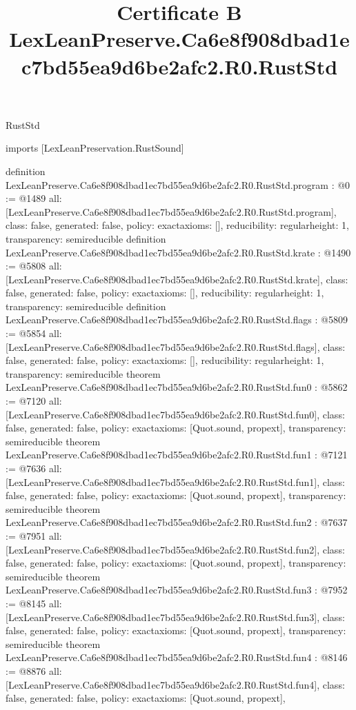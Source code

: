\begin{lexlean}{RustStd}
\title{Certificate B LexLeanPreserve.Ca6e8f908dbad1ec7bd55ea9d6be2afc2.R0.RustStd}
\begin{coremodule}
imports [LexLeanPreservation.RustSound]

definition LexLeanPreserve.Ca6e8f908dbad1ec7bd55ea9d6be2afc2.R0.RustStd.program : @0 := @1489 {
  all: [LexLeanPreserve.Ca6e8f908dbad1ec7bd55ea9d6be2afc2.R0.RustStd.program],
  class: false,
  generated: false,
  policy: exact{axioms: []},
  reducibility: regular{height: 1},
  transparency: semireducible
}
definition LexLeanPreserve.Ca6e8f908dbad1ec7bd55ea9d6be2afc2.R0.RustStd.krate : @1490 := @5808 {
  all: [LexLeanPreserve.Ca6e8f908dbad1ec7bd55ea9d6be2afc2.R0.RustStd.krate],
  class: false,
  generated: false,
  policy: exact{axioms: []},
  reducibility: regular{height: 1},
  transparency: semireducible
}
definition LexLeanPreserve.Ca6e8f908dbad1ec7bd55ea9d6be2afc2.R0.RustStd.flags : @5809 := @5854 {
  all: [LexLeanPreserve.Ca6e8f908dbad1ec7bd55ea9d6be2afc2.R0.RustStd.flags],
  class: false,
  generated: false,
  policy: exact{axioms: []},
  reducibility: regular{height: 1},
  transparency: semireducible
}
theorem LexLeanPreserve.Ca6e8f908dbad1ec7bd55ea9d6be2afc2.R0.RustStd.fun0 : @5862 := @7120 {
  all: [LexLeanPreserve.Ca6e8f908dbad1ec7bd55ea9d6be2afc2.R0.RustStd.fun0],
  class: false,
  generated: false,
  policy: exact{axioms: [Quot.sound, propext]},
  transparency: semireducible
}
theorem LexLeanPreserve.Ca6e8f908dbad1ec7bd55ea9d6be2afc2.R0.RustStd.fun1 : @7121 := @7636 {
  all: [LexLeanPreserve.Ca6e8f908dbad1ec7bd55ea9d6be2afc2.R0.RustStd.fun1],
  class: false,
  generated: false,
  policy: exact{axioms: [Quot.sound, propext]},
  transparency: semireducible
}
theorem LexLeanPreserve.Ca6e8f908dbad1ec7bd55ea9d6be2afc2.R0.RustStd.fun2 : @7637 := @7951 {
  all: [LexLeanPreserve.Ca6e8f908dbad1ec7bd55ea9d6be2afc2.R0.RustStd.fun2],
  class: false,
  generated: false,
  policy: exact{axioms: [Quot.sound, propext]},
  transparency: semireducible
}
theorem LexLeanPreserve.Ca6e8f908dbad1ec7bd55ea9d6be2afc2.R0.RustStd.fun3 : @7952 := @8145 {
  all: [LexLeanPreserve.Ca6e8f908dbad1ec7bd55ea9d6be2afc2.R0.RustStd.fun3],
  class: false,
  generated: false,
  policy: exact{axioms: [Quot.sound, propext]},
  transparency: semireducible
}
theorem LexLeanPreserve.Ca6e8f908dbad1ec7bd55ea9d6be2afc2.R0.RustStd.fun4 : @8146 := @8876 {
  all: [LexLeanPreserve.Ca6e8f908dbad1ec7bd55ea9d6be2afc2.R0.RustStd.fun4],
  class: false,
  generated: false,
  policy: exact{axioms: [Quot.sound, propext]},
}
\end{coremodule}
\end{lexlean}
